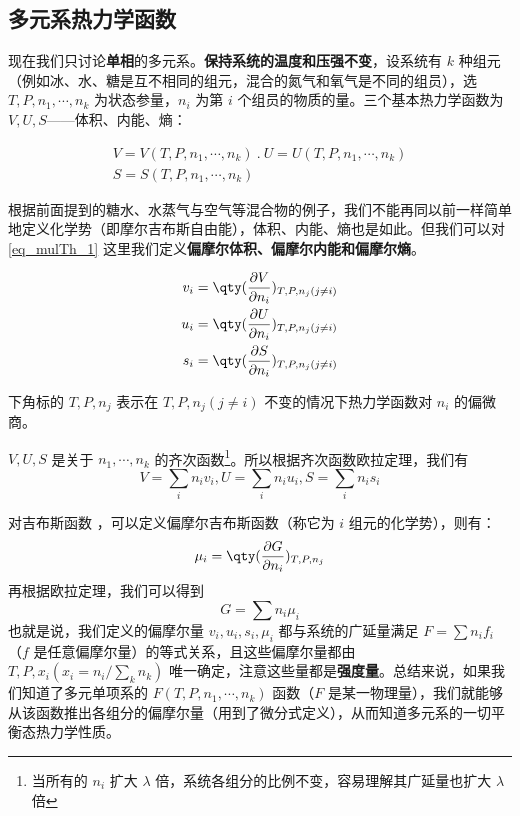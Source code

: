 \subsection{多元系热力学函数}

现在我们只讨论\textbf{单相}的多元系。\textbf{保持系统的温度和压强不变}，设系统有 $k$ 种组元（例如冰、水、糖是互不相同的组元，混合的氮气和氧气是不同的组员），选 $T,P,n_1,\cdots,n_k$ 为状态参量，$n_i$ 为第 $i$ 个组员的物质的量。三个基本热力学函数为 $V,U,S$——体积、内能、熵：

\begin{equation}\label{eq_mulTh_1}
\begin{aligned}
V=V(T,P,n_1,\cdots,n_k)~.\
U=U(T,P,n_1,\cdots,n_k)\\
S=S(T,P,n_1,\cdots,n_k)
\end{aligned}
\end{equation}

根据前面提到的糖水、水蒸气与空气等混合物的例子，我们不能再同以前一样简单地定义化学势（即摩尔吉布斯自由能），体积、内能、熵也是如此。但我们可以对\autoref{eq_mulTh_1}  这里我们定义\textbf{偏摩尔体积、偏摩尔内能和偏摩尔熵}。

\begin{equation}
\begin{aligned}
v_i=\qty(\frac{\partial V}{\partial n_i})_{T,P,n_j(j\neq i)}\\
u_i=\qty(\frac{\partial U}{\partial n_i})_{T,P,n_j(j\neq i)}\\
s_i=\qty(\frac{\partial S}{\partial n_i})_{T,P,n_j(j\neq i)}
\end{aligned}
\end{equation}

下角标的 $T,P,n_j$ 表示在 $T,P,n_j(j\neq i)$ 不变的情况下热力学函数对 $n_i$ 的偏微商。

$V,U,S$ 是关于 $n_1,\cdots,n_k$ 的齐次函数\footnote{当所有的 $n_i$ 扩大 $\lambda$ 倍，系统各组分的比例不变，容易理解其广延量也扩大 $\lambda$ 倍}。所以根据齐次函数欧拉定理，我们有
\begin{equation}
V=\sum_i n_iv_i,U=\sum_i n_iu_i,S=\sum_i n_is_i
\end{equation}

对吉布斯函数 ，可以定义偏摩尔吉布斯函数（称它为 $i$ 组元的化学势），则有：
\begin{equation}\label{eq_mulTh_4}
\mu_i=\qty(\frac{\partial G}{\partial n_i})_{T,P,n_j}
\end{equation}
再根据欧拉定理，我们可以得到
\begin{equation}\label{eq_mulTh_2}
G=\sum n_i \mu_i
\end{equation}
也就是说，我们定义的偏摩尔量 $v_i,u_i,s_i,\mu_i$ 都与系统的广延量满足 $F=\sum n_i f_i$ （$f$ 是任意偏摩尔量）的等式关系，且这些偏摩尔量都由 $T,P,x_i(x_i=n_i/\sum_k n_k)$ 唯一确定，注意这些量都是\textbf{强度量}。总结来说，如果我们知道了多元单项系的 $F(T,P,n_1,\cdots, n_k)$ 函数（$F$ 是某一物理量），我们就能够从该函数推出各组分的偏摩尔量（用到了微分式定义），从而知道多元系的一切平衡态热力学性质。

